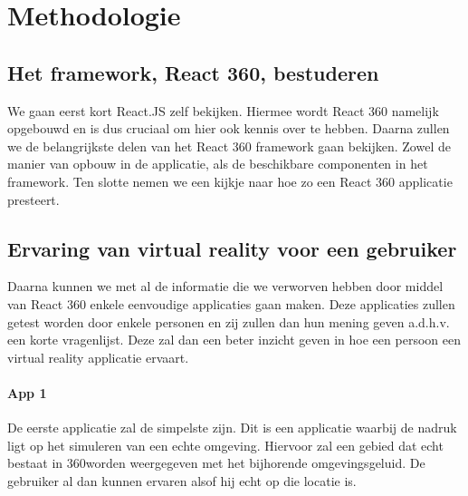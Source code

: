 
\chapter{Methodologie}
\label{ch:methodologie}


\section{Het framework, React 360, bestuderen}
\label{sec:reactvr-bestuderen}
We gaan eerst kort React.JS zelf bekijken. Hiermee wordt React 360 namelijk opgebouwd en is dus cruciaal om hier ook kennis over te hebben. Daarna zullen we de belangrijkste delen van het React 360 framework gaan bekijken. Zowel de manier van opbouw in de applicatie, als de beschikbare componenten in het framework. Ten slotte nemen we een kijkje naar hoe zo een React 360 applicatie presteert.

\section{Ervaring van virtual reality voor een gebruiker}
\label{sec:ervaring-vr-app}
Daarna kunnen we met al de informatie die we verworven hebben door middel van React 360 enkele eenvoudige applicaties gaan maken. Deze applicaties zullen getest worden door enkele personen en zij zullen dan hun mening geven a.d.h.v. een korte vragenlijst. Deze zal dan een beter inzicht geven in hoe een persoon een virtual reality applicatie ervaart.

\subsubsection{App 1}
De eerste applicatie zal de simpelste zijn. Dit is een applicatie waarbij de nadruk ligt op het simuleren van een echte omgeving. Hiervoor zal een gebied dat echt bestaat in 360\textdegree worden weergegeven met het bijhorende omgevingsgeluid. De gebruiker al dan kunnen ervaren alsof hij echt op die locatie is.

